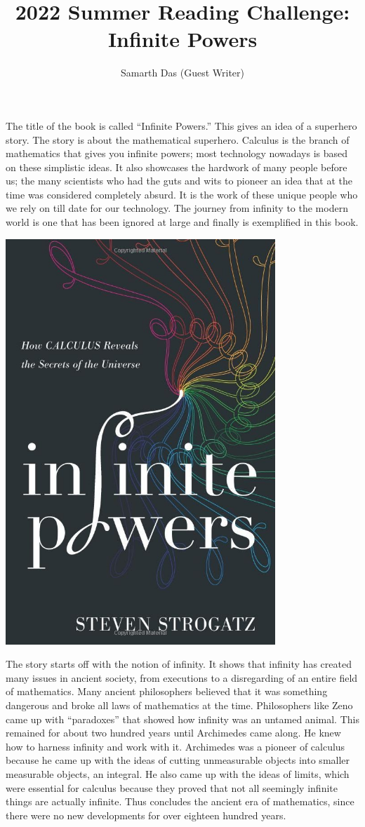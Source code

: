 \documentclass{article}
\title{2022 Summer Reading Challenge: Infinite Powers}
\author{Samarth Das (Guest Writer)}
\begin{document}
The title of the book is called “Infinite Powers.” This gives an idea of a superhero story. The
story is about the mathematical superhero. Calculus is the branch of mathematics that gives you
infinite powers; most technology nowadays is based on these simplistic ideas. It also showcases
the hardwork of many people before us; the many scientists who had the guts and wits to
pioneer an idea that at the time was considered completely absurd. It is the work of these
unique people who we rely on till date for our technology. The journey from infinity to the modern
world is one that has been ignored at large and finally is exemplified in this book.

\begin{center}
   \includegraphics[width=4in]{images/infinity_powers.jpg}
\end{center}

The story starts off with the notion of infinity. It shows that infinity has created many issues in
ancient society, from executions to a disregarding of an entire field of mathematics. Many
ancient philosophers believed that it was something dangerous and broke all laws of
mathematics at the time. Philosophers like Zeno came up with “paradoxes” that showed how
infinity was an untamed animal. This remained for about two hundred years until Archimedes
came along. He knew how to harness infinity and work with it.
Archimedes was a pioneer of calculus because he came up with the ideas of cutting
unmeasurable objects into smaller measurable objects, an integral. He also came up with the
ideas of limits, which were essential for calculus because they proved that not all seemingly
infinite things are actually infinite. Thus concludes the ancient era of mathematics, since there
were no new developments for over eighteen hundred years.
\end{document}
